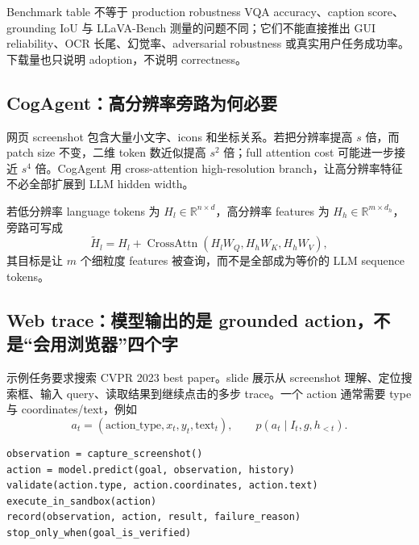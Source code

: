\begin{warningbox}{Benchmark table 不等于 production robustness}
VQA accuracy、caption score、grounding IoU 与 LLaVA-Bench 测量的问题不同；它们不能直接推出 GUI reliability、OCR 长尾、幻觉率、adversarial robustness 或真实用户任务成功率。下载量也只说明 adoption，不说明 correctness。
\end{warningbox}

\subsection{CogAgent：高分辨率旁路为何必要}

网页 screenshot 包含大量小文字、icons 和坐标关系。若把分辨率提高 $s$ 倍，而 patch size 不变，二维 token 数近似提高 $s^2$ 倍；full attention cost 可能进一步接近 $s^4$ 倍。CogAgent 用 cross-attention high-resolution branch，让高分辨率特征不必全部扩展到 LLM hidden width。


若低分辨率 language tokens 为 $H_l\in\mathbb{R}^{n\times d}$，高分辨率 features 为 $H_h\in\mathbb{R}^{m\times d_h}$，旁路可写成
\[
\widetilde H_l=H_l+\operatorname{CrossAttn}(H_lW_Q,H_hW_K,H_hW_V),
\]
其目标是让 $m$ 个细粒度 features 被查询，而不是全部成为等价的 LLM sequence tokens。


\subsection{Web trace：模型输出的是 grounded action，不是“会用浏览器”四个字}

示例任务要求搜索 CVPR 2023 best paper。slide 展示从 screenshot 理解、定位搜索框、输入 query、读取结果到继续点击的多步 trace。一个 action 通常需要 type 与 coordinates/text，例如
\[
a_t=(\text{action\_type},x_t,y_t,\text{text}_t),
\qquad
p(a_t\mid I_t,g,h_{<t}).
\]


\begin{lstlisting}[caption={GUI agent 的最小可审计 action schema}]
observation = capture_screenshot()
action = model.predict(goal, observation, history)
validate(action.type, action.coordinates, action.text)
execute_in_sandbox(action)
record(observation, action, result, failure_reason)
stop_only_when(goal_is_verified)
\end{lstlisting}

